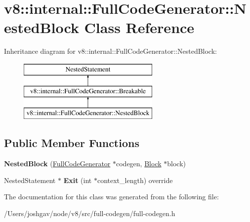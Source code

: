 \hypertarget{classv8_1_1internal_1_1_full_code_generator_1_1_nested_block}{}\section{v8\+:\+:internal\+:\+:Full\+Code\+Generator\+:\+:Nested\+Block Class Reference}
\label{classv8_1_1internal_1_1_full_code_generator_1_1_nested_block}
Inheritance diagram for v8\+:\+:internal\+:\+:Full\+Code\+Generator\+:\+:Nested\+Block\+:\begin{figure}[H]
\begin{center}
\leavevmode
\includegraphics[height=3.000000cm]{classv8_1_1internal_1_1_full_code_generator_1_1_nested_block}
\end{center}
\end{figure}
\subsection*{Public Member Functions}
\begin{DoxyCompactItemize}
\item 
{\bfseries Nested\+Block} (\hyperlink{classv8_1_1internal_1_1_full_code_generator}{Full\+Code\+Generator} $\ast$codegen, \hyperlink{classv8_1_1internal_1_1_block}{Block} $\ast$block)\hypertarget{classv8_1_1internal_1_1_full_code_generator_1_1_nested_block_a99b0fa2fe7d733f214a2e733daca1e9a}{}\label{classv8_1_1internal_1_1_full_code_generator_1_1_nested_block_a99b0fa2fe7d733f214a2e733daca1e9a}

\item 
Nested\+Statement $\ast$ {\bfseries Exit} (int $\ast$context\+\_\+length) override\hypertarget{classv8_1_1internal_1_1_full_code_generator_1_1_nested_block_a630a352ab11cb8b9ce239a47bc0ecc86}{}\label{classv8_1_1internal_1_1_full_code_generator_1_1_nested_block_a630a352ab11cb8b9ce239a47bc0ecc86}

\end{DoxyCompactItemize}


The documentation for this class was generated from the following file\+:\begin{DoxyCompactItemize}
\item 
/\+Users/joshgav/node/v8/src/full-\/codegen/full-\/codegen.\+h\end{DoxyCompactItemize}
